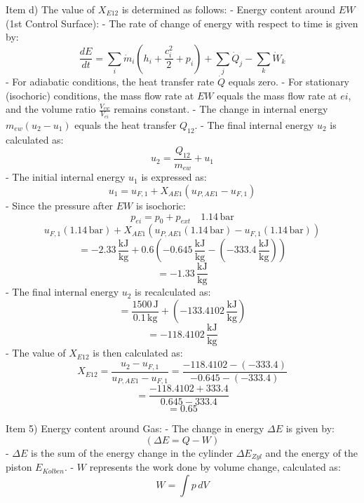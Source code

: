Item d) The value of \(X_{E12}\) is determined as follows:
- Energy content around \(EW\) (1st Control Surface):
  - The rate of change of energy with respect to time is given by:
    \[
    \frac{dE}{dt} = \sum_i \dot{m}_i (h_i + \frac{c_i^2}{2} + p_i) + \sum_j \dot{Q}_j - \sum_k \dot{W}_k
    \]
  - For adiabatic conditions, the heat transfer rate \(\dot{Q}\) equals zero.
  - For stationary (isochoric) conditions, the mass flow rate at \(EW\) equals the mass flow rate at \(ei\), and the volume ratio \(\frac{V_{ew}}{V_{ei}}\) remains constant.
  - The change in internal energy \(m_{ew} (u_2 - u_1)\) equals the heat transfer \(Q_{12}\).
  - The final internal energy \(u_2\) is calculated as:
    \[
    u_2 = \frac{Q_{12}}{m_{ew}} + u_1
    \]
  - The initial internal energy \(u_1\) is expressed as:
    \[
    u_1 = u_{F,1} + X_{AE1} (u_{P,AE1} - u_{F,1})
    \]
  - Since the pressure after \(EW\) is isochoric:
    \[
    p_{ei} = p_0 + p_{ext} \quad 1.14 \, \text{bar}
    \]
    \[
    u_{F,1} (1.14 \, \text{bar}) + X_{AE1} (u_{P,AE1} (1.14 \, \text{bar}) - u_{F,1} (1.14 \, \text{bar}))
    \]
    \[
    = -2.33 \, \frac{\text{kJ}}{\text{kg}} + 0.6 \left( -0.645 \, \frac{\text{kJ}}{\text{kg}} - (-333.4 \, \frac{\text{kJ}}{\text{kg}}) \right)
    \]
    \[
    = -1.33 \, \frac{\text{kJ}}{\text{kg}}
    \]
  - The final internal energy \(u_2\) is recalculated as:
    \[
    = \frac{1500 \, \text{J}}{0.1 \, \text{kg}} + (-133.4102 \, \frac{\text{kJ}}{\text{kg}})
    \]
    \[
    = -118.4102 \, \frac{\text{kJ}}{\text{kg}}
    \]
  - The value of \(X_{E12}\) is then calculated as:
    \[
    X_{E12} = \frac{u_2 - u_{F,1}}{u_{P,AE1} - u_{F,1}} = \frac{-118.4102 - (-333.4)}{-0.645 - (-333.4)}
    \]
    \[
    = \frac{-118.4102 + 333.4}{0.645 - 333.4}
    \]
    \[
    = 0.65
    \]

Item 5) Energy content around Gas:
- The change in energy \(\Delta E\) is given by:
  \[
  \left( \Delta E = Q - W \right)
  \]
  - \(\Delta E\) is the sum of the energy change in the cylinder \(\Delta E_{Zyl}\) and the energy of the piston \(E_{Kolben}\).
  - \(W\) represents the work done by volume change, calculated as:
    \[
    W = \int p \, dV
    \]